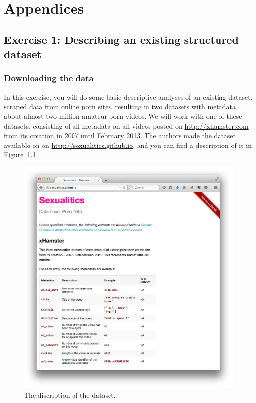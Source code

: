 \documentclass[a4paper,12pt]{book}
\begin{document}
\part{Appendices}
\label{part:appendix}
\begin{appendices}
\appendix

\chapter[Exercise 1]{Exercise 1: Describing an existing structured dataset}
\section{Downloading the data}
In this exercise, you will do some basic descriptive analyses of an existing dataset. \cite{mazieres2014} scraped data from online porn sites, resulting in two datasets with  metadata about almost two million amateur porn videos. We will work with one of these datasets, consisting of all metadata on all videos posted on \url{http://xhamster.com} from its creation in 2007 until February 2013. The authors made the dataset available on on \url{http://sexualitics.github.io}, and you can find a description of it in Figure~\ref{fig:sexualitics}.

\begin{figure}[h!]
\centering
\includegraphics[width=.75\paperwidth,keepaspectratio]{../pictures/sexualitics.png}
\caption{\label{fig:sexualitics}The discription of the dataset.}
\end{figure}


\end{appendices}
\end{document}
